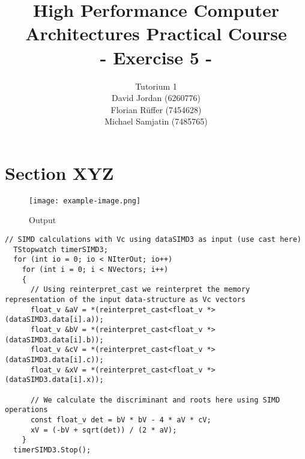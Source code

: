 \documentclass{article}
\title{\textbf{High Performance Computer Architectures Practical Course \\ - Exercise 5 -} \\[10mm]}
\author{Tutorium 1 \\[10mm] David Jordan (6260776) \\[1mm] Florian Rüffer (7454628) \\[1mm] Michael Samjatin (7485765) \\[10mm]}
\begin{document}
\maketitle
\newpage
\section{Section XYZ}

\begin{figure}[H]
    \centering
    \texttt{[image: example-image.png]} 
    \caption{Output}
    \label{fig:example}
  \end{figure}
  

\begin{lstlisting}[caption=QuadraticEquation.cpp]
 // SIMD calculations with Vc using dataSIMD3 as input (use cast here)
  TStopwatch timerSIMD3;
  for (int io = 0; io < NIterOut; io++)
    for (int i = 0; i < NVectors; i++)
    {
      // Using reinterpret_cast we reinterpret the memory representation of the input data-structure as Vc vectors
      float_v &aV = *(reinterpret_cast<float_v *>(dataSIMD3.data[i].a));
      float_v &bV = *(reinterpret_cast<float_v *>(dataSIMD3.data[i].b));
      float_v &cV = *(reinterpret_cast<float_v *>(dataSIMD3.data[i].c));
      float_v &xV = *(reinterpret_cast<float_v *>(dataSIMD3.data[i].x));

      // We calculate the discriminant and roots here using SIMD operations
      const float_v det = bV * bV - 4 * aV * cV;
      xV = (-bV + sqrt(det)) / (2 * aV);
    }
  timerSIMD3.Stop();
\end{lstlisting}
\end{document}
